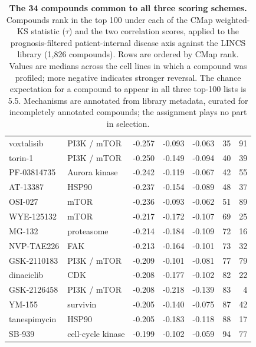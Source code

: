 \begin{table}[!ht]
\begin{tabularx}{\textwidth}{@{}l >{\raggedright\arraybackslash}X S[table-format=-1.3]S[table-format=-1.3]S[table-format=-1.3]rr@{}}
voxtalisib & PI3K / mTOR & -0.257 & -0.093 & -0.063 & 35 & 91 \\
torin-1 & PI3K / mTOR & -0.250 & -0.149 & -0.094 & 40 & 39 \\
PF-03814735 & Aurora kinase & -0.242 & -0.119 & -0.067 & 42 & 55 \\
AT-13387 & HSP90 & -0.237 & -0.154 & -0.089 & 48 & 37 \\
OSI-027 & mTOR & -0.236 & -0.093 & -0.062 & 51 & 89 \\
WYE-125132 & mTOR & -0.217 & -0.172 & -0.107 & 69 & 25 \\
MG-132 & proteasome & -0.214 & -0.184 & -0.109 & 72 & 16 \\
NVP-TAE226 & FAK & -0.213 & -0.164 & -0.101 & 73 & 32 \\
GSK-2110183 & PI3K / mTOR & -0.209 & -0.101 & -0.081 & 77 & 79 \\
dinaciclib & CDK & -0.208 & -0.177 & -0.102 & 82 & 22 \\
GSK-2126458 & PI3K / mTOR & -0.208 & -0.218 & -0.139 & 83 & 4 \\
YM-155 & survivin & -0.205 & -0.140 & -0.075 & 87 & 42 \\
tanespimycin & HSP90 & -0.205 & -0.183 & -0.118 & 88 & 17 \\
SB-939 & cell-cycle kinase & -0.199 & -0.102 & -0.059 & 94 & 77 \\
\bottomrule
\end{tabularx}
\caption{\textbf{The 34 compounds common to all three scoring schemes.} Compounds rank in
the top 100 under each of the CMap weighted-KS statistic ($\tau$) and the two correlation
scores, applied to the prognosis-filtered patient-internal disease axis against the LINCS
library (1{,}826 compounds). Rows are ordered by CMap rank. Values are medians across the
cell lines in which a compound was profiled; more negative indicates stronger reversal. The
chance expectation for a compound to appear in all three top-100 lists is 5.5. Mechanisms
are annotated from library metadata, curated for incompletely annotated compounds; the
assignment plays no part in selection.}
\label{tab:compounds}
\end{table}
